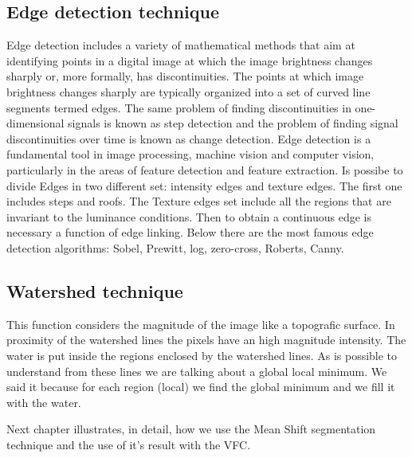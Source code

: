 \subsection{Edge detection technique}
Edge detection includes a variety of mathematical methods that aim at identifying points in a digital image at which the image brightness changes sharply or, more formally, has discontinuities. The points at which image brightness changes sharply are typically organized into a set of curved line segments termed edges. The same problem of finding discontinuities in one-dimensional signals is known as step detection and the problem of finding signal discontinuities over time is known as change detection. Edge detection is a fundamental tool in image processing, machine vision and computer vision, particularly in the areas of feature detection and feature extraction.\cite{edge} Is possibe to divide Edges in two different set: intensity edges and texture edges. The first one includes steps and roofs. The Texture edges set include all the regions that are invariant to the luminance conditions. Then to obtain a continuous edge is necessary a function of edge linking. Below there are the most famous edge detection algorithms: Sobel, Prewitt, log, zero-cross, Roberts, Canny.

\subsection{Watershed technique}
This function considers the magnitude of the image like a topografic surface. In proximity of the watershed lines the pixels have an high magnitude intensity. The water is put inside the regions enclosed by the watershed lines. As is possible to understand from these lines we are talking about a global local minimum. We said it because for each region (local) we find the global minimum and we fill it with the water.

\bigskip

Next chapter illustrates, in detail, how we use the Mean Shift segmentation technique and the use of it's result with the VFC.